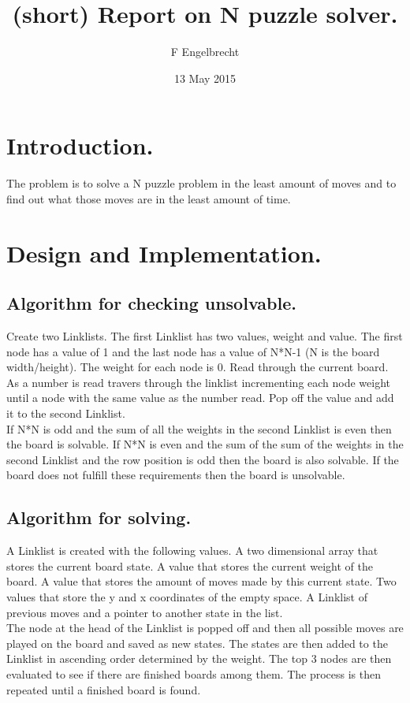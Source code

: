 \documentclass{article}
\title{(short) Report on N puzzle solver.}
\author{F Engelbrecht}
\date{13 May 2015}
\begin{document}
	\maketitle

	\section{Introduction.}

	The problem is to solve a N puzzle problem in the least amount of moves and
	to find out what those moves are in the least amount of time.

	\section{Design and Implementation.}

	\subsection{Algorithm for checking unsolvable.}

	Create two Linklists. The first Linklist has two values, weight and value.
	The first node has a value of 1 and the last node has a value of N*N-1 (N
	is the board width/height). The weight for each node is 0. Read through 
	the current board.  As a number is read travers through the linklist 
	incrementing each node weight until a node with the same value as the 
	number read. Pop off the value and add it to the second Linklist.
	\\
	If N*N is odd and the sum of all the weights in the second Linklist is even
	then the board is solvable. If N*N is even and the sum of the sum of the
	weights in the second Linklist and the row position is odd then the board
	is also solvable. If the board does not fulfill these requirements then the
	board is unsolvable.

	\subsection{Algorithm for solving.}

	A Linklist is created with the following values. A two dimensional array 
	that stores the current board state. A value that stores the current weight
	of the board. A value that stores the amount of moves made by this current
	state. Two values that store the y and x coordinates of the empty space. A
	Linklist of previous moves and a pointer to another state in the list.
	\\
	The node at the head of the Linklist is popped off and then all possible 
	moves are played on the board and saved as new states. The states are then
	added to the Linklist in ascending order determined by the weight. The top 3
	nodes are then evaluated to see if there are finished boards among them. The
	process is then repeated until a finished board is found.
\end{document}

